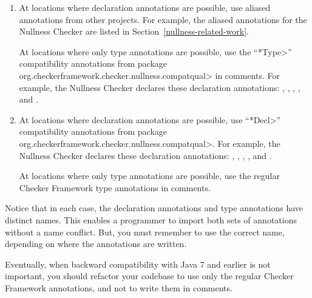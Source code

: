 \begin{enumerate}
\item
At locations where declaration annotations are possible,
use aliased annotations from other projects.  For example, the aliased
annotations for the Nullness Checker are listed in
Section~\ref{nullness-related-work}.

\begin{sloppypar}
At locations where only type annotations are possible, use the
``\<*Type>'' compatibility annotations from package
\<org.checkerframework.checker.nullness.compatqual>
in comments.  For example, the Nullness Checker
declares these declaration annotations:
,
,
,
, and
.
\end{sloppypar}

\item
At locations where declaration annotations are possible,
use ``\<*Decl>'' compatibility annotations from package
\<org.checkerframework.checker.nullness.compatqual>.
For example, the Nullness Checker
declares these declaration annotations:
,
,
,
, and
.

At locations where only type annotations are possible, use the regular
Checker Framework type annotations in comments.
\end{enumerate}

Notice that in each case, the declaration annotations and type annotations
have distinct names.  This enables a programmer to import both sets of
annotations without a name conflict.  But, you must remember to use the
correct name, depending on where the annotations are written.

Eventually, when backward compatibility with Java 7 and earlier is not important,
you should refactor your codebase to use only the regular Checker Framework
annotations, and not to write them in comments.




